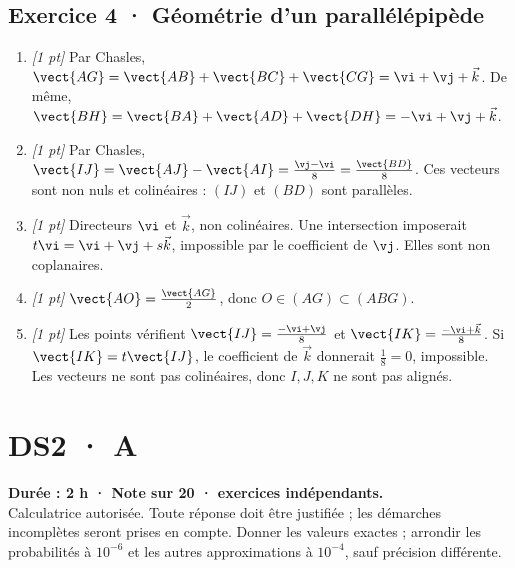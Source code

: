 \subsection*{Exercice 4 · Géométrie d'un parallélépipède}\begin{enumerate}

\item \textit{[1 pt]} Par Chasles, $\vect{AG}=\vect{AB}+\vect{BC}+\vect{CG}=\vi +\vj +\vec k$. De même, $\vect{BH}=\vect{BA}+\vect{AD}+\vect{DH}=-\vi +\vj +\vec k$.

\item \textit{[1 pt]} Par Chasles, $\vect{IJ}=\vect{AJ}-\vect{AI}=\frac{\vj -\vi }{8}=\frac{\vect{BD}}{8}$. Ces vecteurs sont non nuls et colinéaires : $(IJ)$ et $(BD)$ sont parallèles.

\item \textit{[1 pt]} Directeurs $\vi $ et $\vec k$, non colinéaires. Une intersection imposerait $t\vi =\vi +\vj +s\vec k$, impossible par le coefficient de $\vj $. Elles sont non coplanaires.

\item \textit{[1 pt]} $\vect{AO}=\frac{\vect{AG}}{2}$, donc $O\in(AG)\subset(ABG)$.

\item \textit{[1 pt]} Les points vérifient $\vect{IJ}=\frac{-\vi +\vj }{8}$ et $\vect{IK}=\frac{-\vi +\vec k}{8}$. Si $\vect{IK}=t\vect{IJ}$, le coefficient de $\vec k$ donnerait $\frac{1}{8}=0$, impossible. Les vecteurs ne sont pas colinéaires, donc $I,J,K$ ne sont pas alignés.

\end{enumerate}

\fi

\ifmxteacher

\mxnewpage{}\label{sujet:2-3}

\section*{DS2 · A}


\textbf{Durée : 2 h · Note sur 20 ·  exercices indépendants.}\\Calculatrice autorisée. Toute réponse doit être justifiée ; les démarches incomplètes seront prises en compte. Donner les valeurs exactes ; arrondir les probabilités à $10^{-6}$ et les autres approximations à $10^{-4}$, sauf précision différente.

